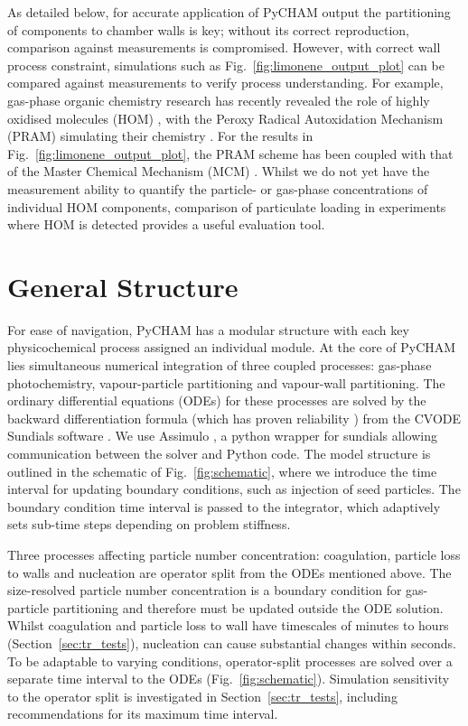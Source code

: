\documentclass[gmd, manuscript]{copernicus}
\begin{document}
As detailed below, for accurate application of PyCHAM output the partitioning of components to chamber walls is key; without its correct reproduction, comparison against measurements is compromised.  However, with correct wall process constraint, simulations such as Fig.~\ref{fig:limonene_output_plot} can be compared against measurements to verify process understanding.  For example, gas-phase organic chemistry research has recently revealed the role of highly oxidised molecules (HOM) \citep{Ehn2014}, with the Peroxy Radical Autoxidation Mechanism (PRAM) simulating their chemistry \citep{Roldin2019}.  For the results in Fig.~\ref{fig:limonene_output_plot}, the PRAM scheme has been coupled with that of the Master Chemical Mechanism (MCM) \citep{Jenkin1997, Saunders2003}.  Whilst we do not yet have the measurement ability to quantify the particle- or gas-phase concentrations of individual HOM components, comparison of particulate loading in experiments where HOM is detected provides a useful evaluation tool.

\section{General Structure}\label{sec:general}

For ease of navigation, PyCHAM has a modular structure with each key physicochemical process assigned an individual module.  At the core of PyCHAM lies simultaneous numerical integration of three coupled processes: gas-phase photochemistry, vapour-particle partitioning and vapour-wall partitioning.  The ordinary differential equations (ODEs) for these processes are solved by the backward differentiation formula (which has proven reliability \citep{Jacobson2005}) from the CVODE Sundials software \citep{hindmarsh2005sundials}.  We use Assimulo \citep{Andersson2015}, a python wrapper for sundials allowing communication between the solver and Python code.  The model structure is outlined in the schematic of Fig.~\ref{fig:schematic}, where we introduce the time interval for updating boundary conditions, such as injection of seed particles.  The boundary condition time interval is passed to the integrator, which adaptively sets sub-time steps depending on problem stiffness.  

Three processes affecting particle number concentration: coagulation, particle loss to walls and nucleation are operator split from the ODEs mentioned above.  The size-resolved particle number concentration is a boundary condition for gas-particle partitioning and therefore must be updated outside the ODE solution.  Whilst coagulation and particle loss to wall have timescales of minutes to hours (Section~\ref{sec:tr_tests}), nucleation can cause substantial changes within seconds.  To be adaptable to varying conditions, operator-split processes are solved over a separate time interval to the ODEs (Fig.~\ref{fig:schematic}).  Simulation sensitivity to the operator split is investigated in Section~\ref{sec:tr_tests}, including recommendations for its maximum time interval. 
 
\end{document}
